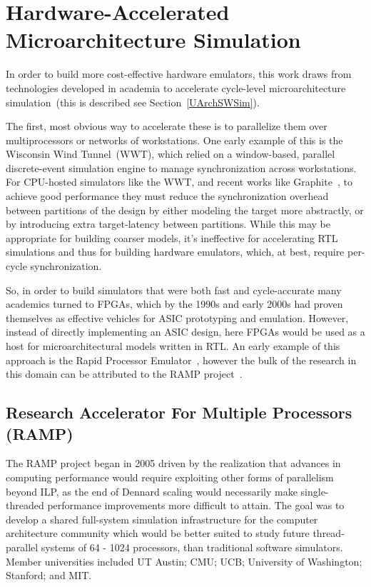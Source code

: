 \section{Hardware-Accelerated Microarchitecture Simulation}

In order to build more cost-effective hardware emulators, this work draws from
technologies developed in academia to accelerate cycle-level microarchitecture
simulation~(this is described see Section~\ref{UArchSWSim}).

The first, most obvious way to accelerate these is to
parallelize them over multiprocessors or networks of workstations.
One early example of this is the Wisconsin Wind Tunnel~(WWT)\cite{WisconsinWindTunnel}, which relied
on a window-based, parallel discrete-event simulation engine to manage synchronization
across workstations. For CPU-hosted simulators like the WWT, and recent works like Graphite~\cite{Graphite}, to achieve
good performance they must reduce the synchronization overhead between
partitions of the design by either modeling the target more abstractly, or by
introducing extra target-latency between partitions.  While this may be
appropriate for building coarser models, it's ineffective for accelerating RTL
simulations and thus for building hardware emulators, which, at best, require
per-cycle synchronization.

So, in order to build simulators that were both fast and cycle-accurate
many academics turned to FPGAs, which by the 1990s and early 2000s had proven themselves as effective
vehicles for ASIC prototyping and emulation. However, instead of directly implementing an
ASIC design, here FPGAs would be used as a host for microarchitectural models written in RTL.
An early example of this approach is the Rapid Processor Emulator~\cite{RPM, RPMDesign}, however the bulk of the research
in this domain can be attributed to the RAMP project~\cite{RAMP}.

\subsection{Research Accelerator For Multiple Processors (RAMP)}

The RAMP project began in 2005 driven by the realization that advances in computing performance
would require exploiting other forms of parallelism beyond ILP, as the end of
Dennard scaling would necessarily make single-threaded performance improvements
more difficult to attain. The goal was to develop a shared full-system
simulation infrastructure for the computer architecture community which would
be better suited to study future thread-parallel systems of 64 - 1024
processors, than traditional software simulators. Member universities included UT
Austin; CMU; UCB; University of Washington; Stanford; and MIT.

